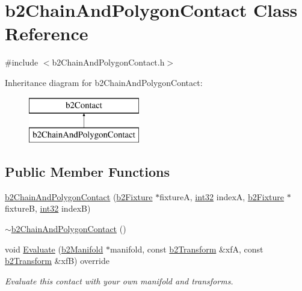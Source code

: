 \hypertarget{classb2_chain_and_polygon_contact}{}\section{b2\+Chain\+And\+Polygon\+Contact Class Reference}
\label{classb2_chain_and_polygon_contact}


{\ttfamily \#include $<$b2\+Chain\+And\+Polygon\+Contact.\+h$>$}

Inheritance diagram for b2\+Chain\+And\+Polygon\+Contact\+:\begin{figure}[H]
\begin{center}
\leavevmode
\includegraphics[height=2.000000cm]{classb2_chain_and_polygon_contact}
\end{center}
\end{figure}
\subsection*{Public Member Functions}
\begin{DoxyCompactItemize}
\item 
\mbox{\hyperlink{classb2_chain_and_polygon_contact_ae43cd05c72ccaeb5f03efc5df944648b}{b2\+Chain\+And\+Polygon\+Contact}} (\mbox{\hyperlink{classb2_fixture}{b2\+Fixture}} $\ast$fixtureA, \mbox{\hyperlink{b2_settings_8h_a43d43196463bde49cb067f5c20ab8481}{int32}} indexA, \mbox{\hyperlink{classb2_fixture}{b2\+Fixture}} $\ast$fixtureB, \mbox{\hyperlink{b2_settings_8h_a43d43196463bde49cb067f5c20ab8481}{int32}} indexB)
\item 
\mbox{\hyperlink{classb2_chain_and_polygon_contact_a96a50e3119cb36040f5d75ffb5a68ae9}{$\sim$b2\+Chain\+And\+Polygon\+Contact}} ()
\item 
void \mbox{\hyperlink{classb2_chain_and_polygon_contact_a607e7a8b4b0a5ee9bfd100a365fb6f3b}{Evaluate}} (\mbox{\hyperlink{structb2_manifold}{b2\+Manifold}} $\ast$manifold, const \mbox{\hyperlink{structb2_transform}{b2\+Transform}} \&xfA, const \mbox{\hyperlink{structb2_transform}{b2\+Transform}} \&xfB) override
\begin{DoxyCompactList}\small\item\em Evaluate this contact with your own manifold and transforms. \end{DoxyCompactList}\end{DoxyCompactItemize}
